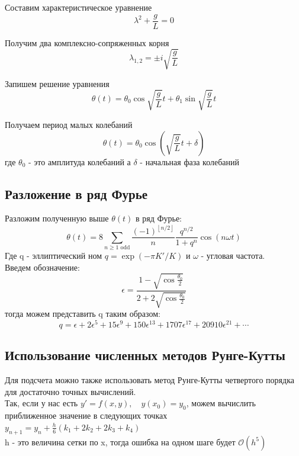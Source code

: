 \documentclass[a4paper,12pt]{article}
\begin{document}
Составим характеристическое уравнение
\begin{equation}
\lambda^2 + \frac{g}{L} = 0
\end{equation}

Получим два комплексно-сопряженных корня
\begin{equation}
\lambda_{1,2} = \pm i \sqrt{\frac{g}{L}}
\end{equation}

Запишем решение уравнения
\begin{equation}
\theta(t) = \theta_0 \cos{\sqrt{\frac{g}{L}} t} + \theta_1 \sin{\sqrt{\frac{g}{L}} t}
\end{equation}

Получаем период малых колебаний
\begin{equation}
\theta(t) = \theta_0\cos{\left(\sqrt{\frac{g}{L}}t+\delta\right)}
\end{equation}
где $\theta_0$ - это амплитуда колебаний 
а $\delta$ - начальная фаза колебаний

\subsection{Разложение в ряд Фурье}
Разложим полученную выше $\theta(t)$ в ряд Фурье:
\begin{equation}
     \theta (t)=8\sum _{n\geq 1{\text{ odd}}}{\frac {(-1)^{\left\lfloor {n/2}\right\rfloor }}{n}}{\frac {q^{n/2}}{1+q^{n}}}\cos(n\omega t)
\end{equation}
Где q - эллиптический ном $q=\exp(-\pi K'/K)$ и $\omega$ - угловая частота.
\\Введем обозначение:
\begin{equation}
    \epsilon ={\frac {1-{\sqrt {\cos {\frac {\theta _{0}}{2}}}}}{2+2{\sqrt {\cos {\frac {\theta _{0}}{2}}}}}}
\end{equation}
тогда можем представить q таким образом:
\begin{equation}
    {\displaystyle q=\epsilon +2\epsilon ^{5}+15\epsilon ^{9}+150\epsilon ^{13}+1707\epsilon ^{17}+20910\epsilon ^{21}+\cdots }
\end{equation}

\subsection{Использование численных методов Рунге-Кутты}
Для подсчета можно также использовать метод Рунге-Кутты четвертого порядка для достаточно точных вычислений.
\\Так, если у нас есть $y' = f(x, y),\quad y(x_{0})=  y_{0}$, можем вычислить приближенное значение в следующих точках $ y_{n+1} = y_n + {\frac{h}{6}}(k_1 + 2k_2 + 2k_3 + k_4)$
\\h - это величина сетки по x, тогда ошибка на одном шаге будет $\mathcal{O}(h^5)$
\end{document}
